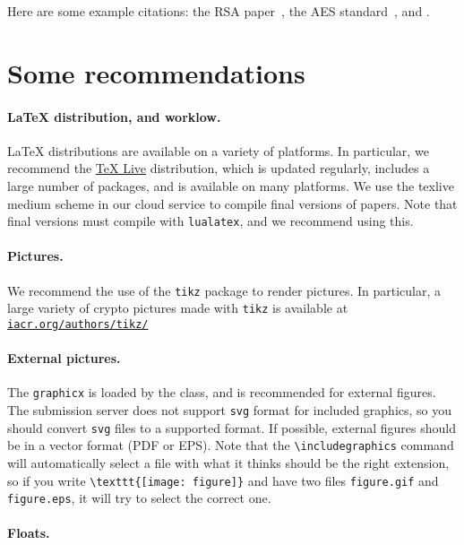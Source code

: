 \documentclass{iacrcc}
\begin{document}
Here are some example citations: the RSA paper~\cite{RSA78}, the AES
standard~\cite{AES-FIPS}, and \cite{DBLP:conf/crypto/Kocher96}.

\section{Some recommendations}\label{sec:options}

\paragraph{\LaTeX{} distribution, and worklow.}  \LaTeX{}
distributions are available on a variety of platforms.  In particular,
we recommend the \href{https://www.tug.org/texlive/}{TeX Live}
distribution, which is updated regularly, includes a large number of
packages, and is available on many platforms. We use the texlive medium
scheme in our cloud service to compile final versions of papers. Note that
final versions must compile with \texttt{lualatex}, and we recommend
using this.

\paragraph{Pictures.}

We recommend the use of the \texttt{tikz} package to render pictures.
In particular, a large variety of crypto pictures made with
\texttt{tikz} is available at \href{http://iacr.org/authors/tikz/}{\texttt{iacr.org/authors/tikz/}}

\paragraph{External pictures.}  The \texttt{graphicx} is loaded by the
class, and is recommended for external figures. The submission server
does not support \texttt{svg} format for included graphics, so you
should convert \texttt{svg} files to a supported format.  If possible,
external figures should be in a vector format (PDF or EPS).  Note that
the \verb+\includegraphics+ command will automatically select a file
with what it thinks should be the right extension, so if you write
\verb+\texttt{[image: figure]}+ and have two files \texttt{figure.gif}
and \texttt{figure.eps}, it will try to select the correct one.

\paragraph{Floats.}
\end{document}
